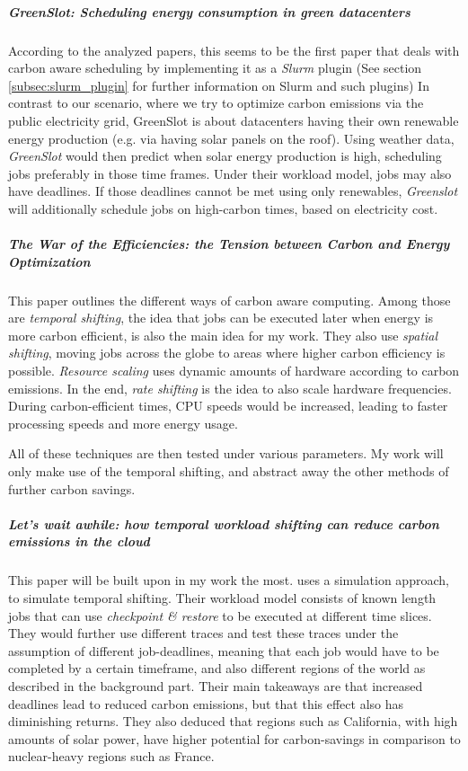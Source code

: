 \subparagraph{GreenSlot: Scheduling energy consumption in green datacenters\cite{inigo_goiri_greenslot_2011}} According to the analyzed papers, this seems to be the first paper that deals with carbon aware scheduling by implementing it as a \emph{Slurm} plugin (See section \ref{subsec:slurm_plugin} for further information on Slurm and such plugins)
In contrast to our scenario, where we try to optimize carbon emissions via the public electricity grid, GreenSlot is about datacenters having their own renewable energy production (e.g. via having solar panels on the roof). 
Using weather data, \emph{GreenSlot} would then predict when solar energy production is high, scheduling jobs preferably in those time frames.
Under their workload model, jobs may also have deadlines.
If those deadlines cannot be met using only renewables, \emph{Greenslot} will additionally schedule jobs on high-carbon times, based on electricity cost.

\subparagraph{The War of the Efficiencies: the Tension between Carbon and Energy Optimization}\cite{hanafy_war_2023} This paper outlines the different ways of carbon aware computing. 
Among those are \emph{temporal shifting}, the idea that jobs can be executed later when energy is more carbon efficient, is also the main idea for my work. 
They also use \emph{spatial shifting}, moving jobs across the globe to areas where higher carbon efficiency is possible. 
\emph{Resource scaling} uses dynamic amounts of hardware according to carbon emissions.
In the end, \emph{rate shifting} is the idea to also scale hardware frequencies. During carbon-efficient times, CPU speeds would be increased, leading to faster processing speeds and more energy usage.

All of these techniques are then tested under various parameters. My work will only make use of the temporal shifting, and abstract away the other methods of further carbon savings.

\subparagraph{Let's wait awhile: how temporal workload shifting can reduce carbon emissions in the cloud} This paper will be built upon in my work the most.
\cite{wiesner_lets_2021} uses a simulation approach, to simulate temporal shifting. Their workload model consists of known length jobs that can use \emph{checkpoint \& restore} to be executed at different time slices. 
They would further use different traces and test these traces under the assumption of different job-deadlines, meaning that each job would have to be completed by a certain timeframe, and also different regions of the world as described in the background part. 
Their main takeaways are that increased deadlines lead to reduced carbon emissions, but that this effect also has diminishing returns. 
They also deduced that regions such as California, with high amounts of solar power, have higher potential for carbon-savings in comparison to nuclear-heavy regions such as France.